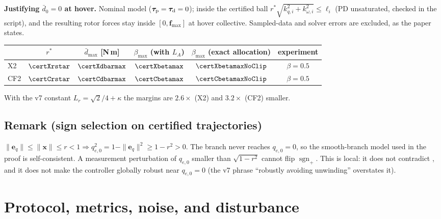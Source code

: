\documentclass[11pt]{article}
\newcommand{\srcroot}{../../..}
\newcommand{\sgnp}{\operatorname{sgn}_{+}}
\newcommand{\code}[1]{\texttt{\detokenize{#1}}}
\theoremstyle{remark}
\newcommand{\listing}[4]{%
  }
\begin{document}
\textbf{Justifying $\bar d_0=0$ at hover.} Nominal model ($\bm\tau_{\rm p}=\bm\tau_{\rm d}=0$); inside the
certified ball $r^*\sqrt{k_{q,i}^2+k_{\omega,i}^2}\le\ell_i$ (PD unsaturated, checked in the script), and the
resulting rotor forces stay inside $[0,\bm f_{\max}]$ at hover collective. Sampled-data and solver errors are
excluded, as the paper states.
\begin{center}\small
\begin{tabular}{@{}lccccc@{}}
\toprule
& $r^*$ & $\bar d_{\max}$ [N\,m] & $\beta_{\max}$ (with $L_A$) & $\beta_{\max}$ (exact allocation) & experiment\\\midrule
X2 & $\certXrstar$ & $\certXdbarmax$ & $\certXbetamax$ & $\certXbetamaxNoClip$ & $\beta=0.5$\\
CF2 & $\certCrstar$ & $\certCdbarmax$ & $\certCbetamax$ & $\certCbetamaxNoClip$ & $\beta=0.5$\\
\bottomrule
\end{tabular}
\end{center}
With the v7 constant $L_r=\sqrt2/4+\kappa$ the margins are $2.6\times$ (X2) and $3.2\times$ (CF2) smaller.
\listing{experiments/theory_certificate_2026-09-12/compute_local_certificate.py}{78}{89}{certificate: $r^*$, $c$, $b$, $\bar d_{\max}$}
\listing{experiments/theory_certificate_2026-09-12/compute_local_certificate.py}{132}{147}{$Q_L$ shape scan, PD saturation check, $\beta_{\max}$}

\subsection{Remark (sign selection on certified trajectories)}
$\|\bm e_q\|\le\|\bm x\|\le r<1\Rightarrow q_{e,0}^2=1-\|\bm e_q\|^2\ge1-r^2>0$. The branch never reaches
$q_{e,0}=0$, so the smooth-branch model used in the proof is self-consistent. A measurement perturbation
of $q_{e,0}$ smaller than $\sqrt{1-r^2}$ cannot flip $\sgnp$. This is local: it does not contradict
\cite{bhat2000topological}, and it does not make the controller globally robust near $q_{e,0}=0$
\cite{mayhew2011hybrid} (the v7 phrase ``robustly avoiding unwinding'' overstates it).

\section{Protocol, metrics, noise, and disturbance}
\end{document}
